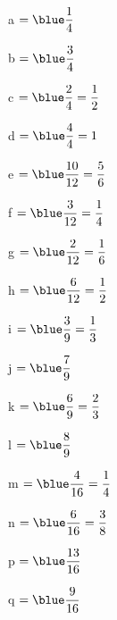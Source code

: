    \begin{colitemize}{2}
      \item a $=\blue \dfrac14$ \medskip
      \item b $=\blue \dfrac34$ \medskip
      \item c $=\blue \dfrac24 =\dfrac12$ \medskip
      \item d $=\blue \dfrac44 =1$ \medskip
      \item e $=\blue \dfrac{10}{12} =\dfrac56$ \medskip
      \item f $=\blue \dfrac{3}{12} =\dfrac14$
      \item g $=\blue \dfrac{2}{12} =\dfrac16$
      \item h $=\blue \dfrac{6}{12} =\dfrac12$
      \item i $=\blue \dfrac39 =\dfrac13$
      \item j $=\blue \dfrac79$
      \item k $=\blue \dfrac69 =\dfrac23$
      \item l $=\blue \dfrac89$
      \item m $=\blue \dfrac{4}{16} =\dfrac14$
      \item n $=\blue \dfrac{6}{16} =\dfrac38$
      \item p $=\blue \dfrac{13}{16}$
      \item q $=\blue \dfrac{9}{16}$
   \end{colitemize}
